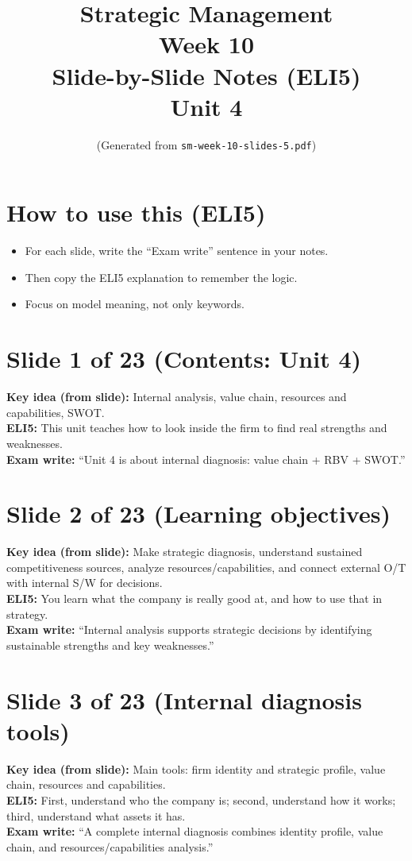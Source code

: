\documentclass[11pt,a4paper]{article}
\title{Strategic Management \\ Week 10 \\ Slide-by-Slide Notes (ELI5) \\ Unit 4}
\author{(Generated from \texttt{sm-week-10-slides-5.pdf})}
\date{}
\begin{document}
\maketitle

\section*{How to use this (ELI5)}
\begin{itemize}
  \item For each slide, write the ``Exam write'' sentence in your notes.
  \item Then copy the ELI5 explanation to remember the logic.
  \item Focus on model meaning, not only keywords.
\end{itemize}

\section*{Slide 1 of 23 (Contents: Unit 4)}
\textbf{Key idea (from slide):} Internal analysis, value chain, resources and capabilities, SWOT.\\
\textbf{ELI5:} This unit teaches how to look inside the firm to find real strengths and weaknesses.\\
\textbf{Exam write:} ``Unit 4 is about internal diagnosis: value chain + RBV + SWOT.''

\section*{Slide 2 of 23 (Learning objectives)}
\textbf{Key idea (from slide):} Make strategic diagnosis, understand sustained competitiveness sources, analyze resources/capabilities, and connect external O/T with internal S/W for decisions.\\
\textbf{ELI5:} You learn what the company is really good at, and how to use that in strategy.\\
\textbf{Exam write:} ``Internal analysis supports strategic decisions by identifying sustainable strengths and key weaknesses.''

\section*{Slide 3 of 23 (Internal diagnosis tools)}
\textbf{Key idea (from slide):} Main tools: firm identity and strategic profile, value chain, resources and capabilities.\\
\textbf{ELI5:} First, understand who the company is; second, understand how it works; third, understand what assets it has.\\
\textbf{Exam write:} ``A complete internal diagnosis combines identity profile, value chain, and resources/capabilities analysis.''
\end{document}
